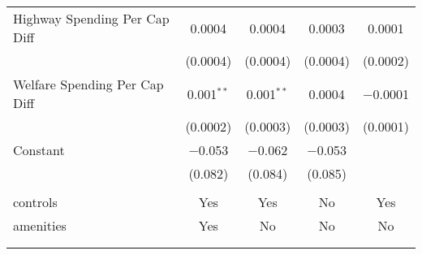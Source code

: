 \begin{table}[!htbp]
\begin{tabular}{@{\extracolsep{5pt}}lcccc}
  Highway Spending Per Cap Diff & 0.0004 & 0.0004 & 0.0003 & 0.0001 \\ 
  & (0.0004) & (0.0004) & (0.0004) & (0.0002) \\ 
  Welfare Spending Per Cap Diff & 0.001$^{**}$ & 0.001$^{**}$ & 0.0004 & $-$0.0001 \\ 
  & (0.0002) & (0.0003) & (0.0003) & (0.0001) \\ 
  Constant & $-$0.053 & $-$0.062 & $-$0.053 &  \\ 
  & (0.082) & (0.084) & (0.085) &  \\ 
 \hline \\[-1.8ex] 
controls & Yes & Yes & No & Yes \\ 
amenities & Yes & No & No & No \\ 
\hline \\[-1.8ex] 
\hline 
\hline \\[-1.8ex] 
\end{tabular} 
\end{table} 

